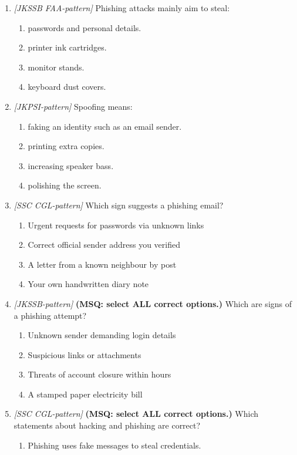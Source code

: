 \begin{enumerate}[label=\textbf{Q\arabic*.}, leftmargin=*]
\item \textit{[JKSSB FAA-pattern]} Phishing attacks mainly aim to steal:
  \begin{enumerate}[label=\Alph*.]
    \item passwords and personal details.
    \item printer ink cartridges.
    \item monitor stands.
    \item keyboard dust covers.
  \end{enumerate}
\item \textit{[JKPSI-pattern]} Spoofing means:
  \begin{enumerate}[label=\Alph*.]
    \item faking an identity such as an email sender.
    \item printing extra copies.
    \item increasing speaker bass.
    \item polishing the screen.
  \end{enumerate}
\item \textit{[SSC CGL-pattern]} Which sign suggests a phishing email?
  \begin{enumerate}[label=\Alph*.]
    \item Urgent requests for passwords via unknown links
    \item Correct official sender address you verified
    \item A letter from a known neighbour by post
    \item Your own handwritten diary note
  \end{enumerate}
\item \textit{[JKSSB-pattern]} \textbf{(MSQ: select ALL correct options.)} Which are signs of a phishing attempt?
  \begin{enumerate}[label=\Alph*.]
    \item Unknown sender demanding login details
    \item Suspicious links or attachments
    \item Threats of account closure within hours
    \item A stamped paper electricity bill
  \end{enumerate}
\item \textit{[SSC CGL-pattern]} \textbf{(MSQ: select ALL correct options.)} Which statements about hacking and phishing are correct?
  \begin{enumerate}[label=\Alph*.]
    \item Phishing uses fake messages to steal credentials.

\end{enumerate}
\end{enumerate}

